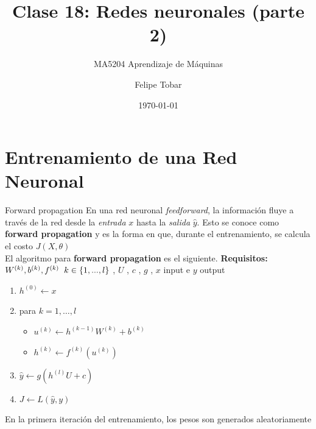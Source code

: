 \documentclass[handout, 9pt]{beamer}
\title{Clase 18: Redes neuronales (parte 2)}
\subtitle{MA5204 Aprendizaje de Máquinas}
\date{\today}
\author{Felipe Tobar}
\institute{Iniciativa de Datos e Inteligencia Artificial\\Universidad de Chile}
\begin{document}
\begin{frame}
  \titlepage
\end{frame}

\section{Entrenamiento de una Red Neuronal}

\begin{frame}{Forward propagation}
En una red neuronal \textit{feedforward}, la información fluye a través de la red desde la \emph{entrada} $x$ hasta la \emph{salida} $\hat{y}$. Esto se conoce como \textbf{forward propagation} y es la forma en que, durante el entrenamiento, se calcula el costo $J(X, \theta)$\\
\vfill
El algoritmo para \textbf{forward propagation} es el siguiente. 
\newline
\hspace{0.5cm} \textbf{Requisitos: }   $W^{(k)} , b^{(k)} , f^{(k)} \hspace{0.2cm} k \in \{1,...,l\}$ , $U$ , $c$ , $g$ , $x$ input e $y$ output  \pause
\begin{enumerate}
  \item $h^{(0)} \gets x$ \pause
  \item para $k = 1 , \dots , l$
  \begin{itemize}
    \item $u^{(k)} \gets h^{(k-1)}W^{(k)} + b^{(k)}$ \pause
    \item $h^{(k)} \gets f^{(k)}(u^{(k)})$ \pause
  \end{itemize}
  \item $\hat{y} \gets g(h^{(l)}U + c)$ \pause
  \item $J \gets L(\hat{y},y)$ \pause

\end{enumerate}

\begin{observacion}
En la primera iteración del entrenamiento, los pesos son generados aleatoriamente
\end{observacion}

\end{frame}
\end{document}
